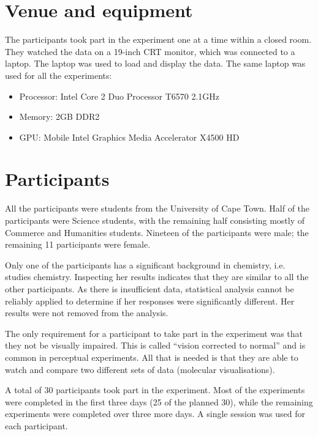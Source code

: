 \section{Venue and equipment}
\label{sec:experiment_venue}

The participants took part in the experiment one at a time within a closed
room. They watched the data on a 19-inch CRT monitor, which was connected to a
laptop. The laptop was used to load and display the data. The same laptop was
used for all the experiments: \begin{itemize} \item Processor: Intel Core 2 Duo
Processor T6570 2.1GHz \item Memory: 2GB DDR2 \item GPU: Mobile Intel Graphics
Media Accelerator X4500 HD \end{itemize}


\section{Participants}
\label{sec:experiment_participants}

All the participants were students from the University of Cape Town. Half of
the participants were Science students, with the remaining half consisting
mostly of Commerce and Humanities students. Nineteen of the participants were
male; the remaining 11 participants were female.

Only one of the participants has a significant background in chemistry, i.e.
studies chemistry. Inspecting her results indicates that they are similar to
all the other participants. As there is insufficient data, statistical analysis
cannot be reliably applied to determine if her responses were significantly
different. Her results were not removed from the analysis.

The only requirement for a participant to take part in the experiment was that
they not be visually impaired. This is called ``vision corrected to normal''
and is common in perceptual experiments. All that is needed is that they are
able to watch and compare two different sets of data (molecular
visualisations).

A total of 30 participants took part in the experiment. Most of the experiments
were completed in the first three days (25 of the planned 30), while the
remaining experiments were completed over three more days. A single session was
used for each participant.

